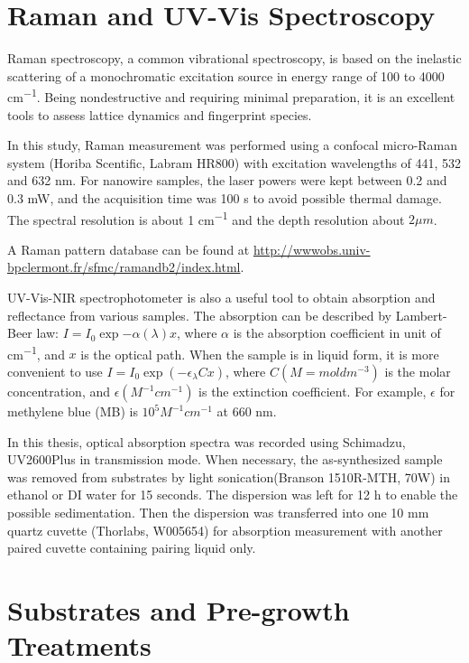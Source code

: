 \section{Raman and UV-Vis Spectroscopy}

Raman spectroscopy, a common vibrational spectroscopy, is based on the inelastic scattering of a monochromatic excitation source in energy range of 100 to 4000 \si{cm^{-1}}. Being nondestructive and requiring minimal preparation, 
it is an excellent tools to assess lattice dynamics and fingerprint species.\cite{McCreery2000} 

In this study, Raman measurement was performed using a confocal micro-Raman system (Horiba Scentific, Labram HR800) with excitation wavelengths of 441, 532 and 632 nm. For nanowire samples, the laser powers were kept between 0.2 and 0.3 mW, and the acquisition time was 100 s to avoid possible thermal damage. The spectral resolution is about 1 \si{cm^{-1}} and the depth resolution about $2 \mu m$.  

A Raman pattern database can be found at \url{http://wwwobs.univ-bpclermont.fr/sfmc/ramandb2/index.html}. 

UV-Vis-NIR spectrophotometer is also a useful tool to obtain absorption and reflectance from various samples. The absorption can be described by Lambert-Beer law: $I = I_0 \exp{-\alpha(\lambda) x}$, where $\alpha$ is the absorption coefficient in unit of \si{cm^{-1}}, and $x$ is the optical path. When the sample is in liquid form, it is more convenient to use $I = I_0 \exp(-\epsilon_\lambda C x)$, where $C(M = mol dm^{-3})$ is the molar concentration, and $\epsilon (M^{-1}cm^{-1})$ is the extinction coefficient. For example, $\epsilon$ for methylene blue (MB) is $10^5 M^{-1}cm^{-1}$ at 660 nm.\cite{Mills1999}

In this thesis, optical absorption spectra was recorded using Schimadzu, UV2600Plus in transmission mode. When necessary, the as-synthesized sample was removed from substrates by light sonication(Branson 1510R-MTH, 70W) in ethanol or DI water for 15 seconds. The dispersion was left for 12 h to enable the possible sedimentation. Then the dispersion was transferred into one 10 mm quartz cuvette (Thorlabs, W005654) for absorption measurement with another paired cuvette containing pairing liquid only. 


\section{Substrates and Pre-growth Treatments}\label{ch2sub}

